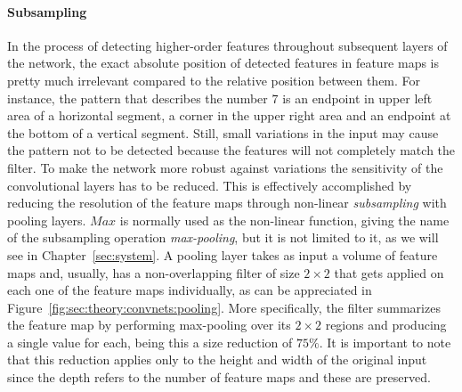 \paragraph{Subsampling}
In the process of detecting higher-order features throughout subsequent layers of the network, the exact absolute position of detected features in feature maps is pretty much irrelevant compared to the relative position between them.
For instance, the pattern that describes the number $7$ is an endpoint in upper left area of a horizontal segment, a corner in the upper right area and an endpoint at the bottom of a vertical segment.
Still, small variations in the input may cause the pattern not to be detected because the features will not completely match the filter.
To make the network more robust against variations the sensitivity of the convolutional layers has to be reduced.
This is effectively accomplished by reducing the resolution of the feature maps through non-linear \emph{subsampling} with pooling layers.
$Max$ is normally used as the non-linear function, giving the name of the subsampling operation \emph{max-pooling}, but it is not limited to it, as we will see in Chapter~\ref{sec:system}.
A pooling layer takes as input a volume of feature maps and, usually, has a non-overlapping filter of size ${2}\times{2}$ that gets applied on each one of the feature maps individually, as can be appreciated in Figure~\ref{fig:sec:theory:convnets:pooling}.
More specifically, the filter summarizes the feature map by performing max-pooling over its ${2}\times{2}$ regions and producing a single value for each, being this a size reduction of $75\%$.
It is important to note that this reduction applies only to the height and width of the original input since the depth refers to the number of feature maps and these are preserved.

